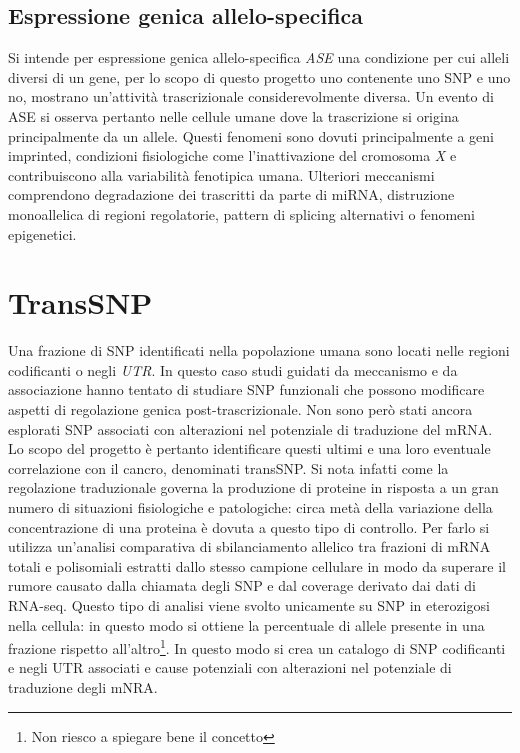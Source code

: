 \subsection{Espressione genica allelo-specifica}
Si intende per espressione genica allelo-specifica \emph{ASE} una condizione per cui alleli diversi di un gene, per lo scopo di questo progetto uno contenente uno SNP e uno no, mostrano un'attivit\`a trascrizionale considerevolmente diversa.
Un evento di ASE si osserva pertanto nelle cellule umane dove la trascrizione si origina principalmente da un allele.
Questi fenomeni sono dovuti principalmente a geni imprinted, condizioni fisiologiche come l'inattivazione del cromosoma \emph{X} e contribuiscono alla variabilit\`a fenotipica umana.
Ulteriori meccanismi comprendono degradazione dei trascritti da parte di miRNA, distruzione monoallelica di regioni regolatorie, pattern di splicing alternativi o fenomeni epigenetici.

\section{TransSNP}
Una frazione di SNP identificati nella popolazione umana sono locati nelle regioni codificanti o negli \emph{UTR}.
In questo caso studi guidati da meccanismo e da associazione hanno tentato di studiare SNP funzionali che possono modificare aspetti di regolazione genica post-trascrizionale.
Non sono per\`o stati ancora esplorati SNP associati con alterazioni nel potenziale di traduzione del mRNA.
Lo scopo del progetto \`e pertanto identificare questi ultimi e una loro eventuale correlazione con il cancro, denominati transSNP.
Si nota infatti come la regolazione traduzionale governa la produzione di proteine in risposta a un gran numero di situazioni fisiologiche e patologiche: circa met\`a della variazione della concentrazione di una proteina \`e dovuta a questo tipo di controllo.
Per farlo si utilizza un'analisi comparativa di sbilanciamento allelico tra frazioni di mRNA totali e polisomiali estratti dallo stesso campione cellulare in modo da superare il rumore causato dalla chiamata degli SNP e dal coverage derivato dai dati di RNA-seq.
Questo tipo di analisi viene svolto unicamente su SNP in eterozigosi nella cellula: in questo modo si ottiene la percentuale di allele presente in una frazione rispetto all'altro\footnote{Non riesco a spiegare bene il concetto}.
In questo modo si crea un catalogo di SNP codificanti e negli UTR associati e cause potenziali con alterazioni nel potenziale di traduzione degli mNRA.

